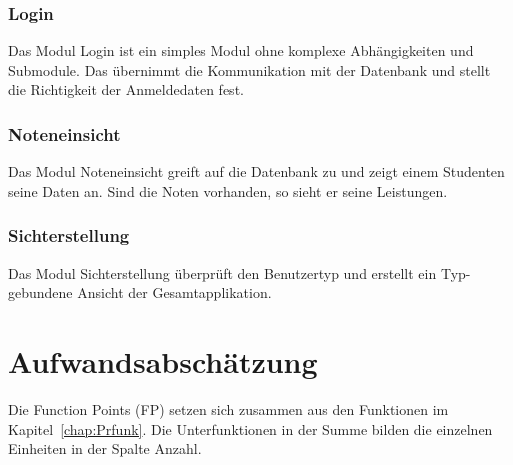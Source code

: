 \begin{appendix}
		
	\subsubsection{Login}
	Das Modul Login ist ein simples Modul ohne komplexe Abhängigkeiten und Submodule. Das übernimmt die Kommunikation mit der Datenbank und stellt die Richtigkeit der Anmeldedaten fest.
	
	\subsubsection{Noteneinsicht}
	Das Modul Noteneinsicht  greift auf die Datenbank zu und zeigt einem Studenten seine Daten an. Sind die Noten vorhanden, so sieht er seine Leistungen.
	
	\subsubsection{Sichterstellung}
	
	Das Modul Sichterstellung überprüft den Benutzertyp und erstellt ein Typ-gebundene Ansicht der Gesamtapplikation.

  
  
  \section{Aufwandsabschätzung}
  
   Die Function Points (FP) setzen sich zusammen aus den Funktionen im Kapitel~\ref{chap:Prfunk}. Die Unterfunktionen in der Summe bilden die einzelnen Einheiten in der Spalte Anzahl. 
  

\end{appendix}
